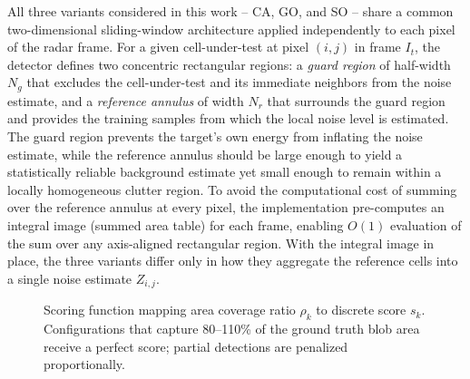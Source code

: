 \documentclass[conf]{new-aiaa}
\begin{document}
All three variants considered in this work -- CA, GO, and SO -- share a common two-dimensional sliding-window architecture applied independently to each pixel of the radar frame. For a given cell-under-test at pixel $(i,j)$ in frame $I_t$, the detector defines two concentric rectangular regions: a \emph{guard region} of half-width $N_g$ that excludes the cell-under-test and its immediate neighbors from the noise estimate, and a \emph{reference annulus} of width $N_r$ that surrounds the guard region and provides the training samples from which the local noise level is estimated. The guard region prevents the target's own energy from inflating the noise estimate, while the reference annulus should be large enough to yield a statistically reliable background estimate yet small enough to remain within a locally homogeneous clutter region. To avoid the computational cost of summing over the reference annulus at every pixel, the implementation pre-computes an integral image (summed area table) \cite{crow1984} for each frame, enabling $O(1)$ evaluation of the sum over any axis-aligned rectangular region. With the integral image in place, the three variants differ only in how they aggregate the reference cells into a single noise estimate $Z_{i,j}$.

\begin{figure}[t]
    \centering
    \caption{Scoring function mapping area coverage ratio $\rho_k$ to discrete score $s_k$. Configurations that capture 80--110\% of the ground truth blob area receive a perfect score; partial detections are penalized proportionally.}
    \label{fig:scoring_function}
\end{figure}
\end{document}
